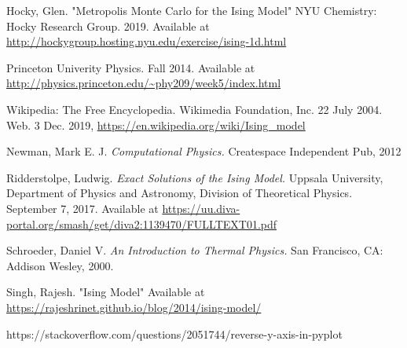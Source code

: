 \documentclass[11pt]{article}
\begin{document}
\begin{thebibliography}{10}

Hocky, Glen. "Metropolis Monte Carlo for the Ising Model" NYU Chemistry: Hocky Research Group. 2019. Available at \url{http://hockygroup.hosting.nyu.edu/exercise/ising-1d.html}

  Princeton Univerity Physics. Fall 2014. Available at \url{http://physics.princeton.edu/~phy209/week5/index.html}

  Wikipedia: The Free Encyclopedia. Wikimedia Foundation, Inc. 22 July 2004. Web. 3 Dec. 2019, \url{https://en.wikipedia.org/wiki/Ising_model}

 Newman, Mark E. J. \emph{Computational Physics.} Createspace Independent Pub, 2012

 Ridderstolpe, Ludwig. \emph{Exact Solutions of the Ising Model.} 
Uppsala University, Department of Physics and Astronomy, Division of Theoretical Physics. September 7, 2017. Available at \url{https://uu.diva-portal.org/smash/get/diva2:1139470/FULLTEXT01.pdf}

 Schroeder, Daniel V. \emph{An Introduction to Thermal Physics.} San Francisco, CA: Addison Wesley, 2000.

 Singh, Rajesh. "Ising Model" Available at \url{https://rajeshrinet.github.io/blog/2014/ising-model/}

 https://stackoverflow.com/questions/2051744/reverse-y-axis-in-pyplot

\end{thebibliography}
\end{document}
